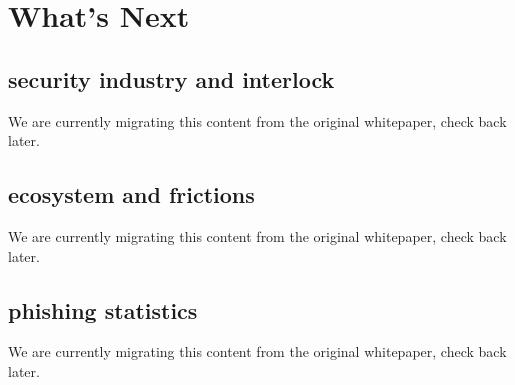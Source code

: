 \documentclass[a4paper]{article}
\begin{document}
\section{What's Next}

\subsection{security industry and interlock}

We are currently migrating this content from the original whitepaper,
check back later.

\subsection{ecosystem and frictions}

We are currently migrating this content from the original whitepaper,
check back later.

\subsection{phishing statistics}

We are currently migrating this content from the original whitepaper,
check back later.
\end{document}
